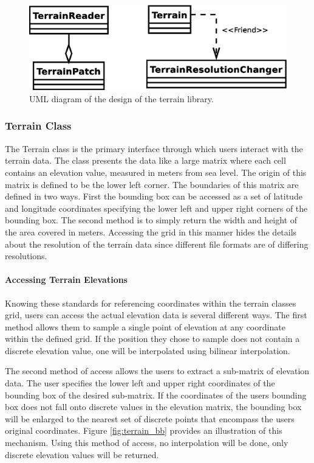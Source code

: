 \begin{figure}[ht]
\begin{center}
		\includegraphics[scale=0.45]{images/network_vis/terrain_lib_diagram.eps}
\end{center}
\caption{UML diagram of the design of the terrain library.}
\label{fig:terrain_lib_diagram}
\end{figure}

\subsubsection{Terrain Class}
The Terrain class is the primary interface through which users interact with the terrain data.  The class presents the data like a large matrix where each cell contains an elevation value, measured in meters from sea level.  The origin of this matrix is defined to be the lower left corner.  The boundaries of this matrix are defined in two ways.  First the bounding box can be accessed as a set of latitude and longitude coordinates specifying the lower left and upper right corners of the bounding box.  The second method is to simply return the width and height of the area covered in meters.  Accessing the grid in this manner hides the details about the resolution of the terrain data since different file formats are of differing resolutions.

\paragraph{Accessing Terrain Elevations}
Knowing these standards for referencing coordinates within the terrain classes grid, users can access the actual elevation data is several different ways.  The first method allows them to sample a single point of elevation at any coordinate within the defined grid.  If the position they chose to sample does not contain a discrete elevation value, one will be interpolated using bilinear interpolation.

The second method of access allows the users to extract a sub-matrix of elevation data.  The user specifies the lower left and upper right coordinates of the bounding box of the desired sub-matrix.  If the coordinates of the users bounding box does not fall onto discrete values in the elevation matrix, the bounding box will be enlarged to the nearest set of discrete points that encompass the users original coordinates.  Figure \ref{fig:terrain_bb} provides an illustration of this mechanism.  Using this method of access, no interpolation will be done, only discrete elevation values will be returned.


